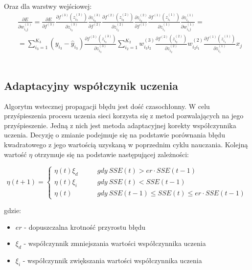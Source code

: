 \documentclass[12pt,twoside]{article}
\begin{document}
Oraz dla warstwy wejściowej:\\
\begin{equation}
\begin{aligned}
&\frac{\partial E}{\partial w_{i_{1}j}^{(1)}} = \frac{\partial E}{\partial f^{(3)}} \frac{\partial f^{(3)}\left( z_{i_{3}}^{(3)} \right)}{\partial z_{i_{3}}^{(3)}} \frac{\partial z_{i_{3}}^{(3)}}{\partial f^{(2)}} \frac{\partial f^{(2)}\left( z_{i_{2}}^{(2)} \right)}{\partial z_{i_{2}}^{(2)}} \frac{\partial z_{i_{2}}^{(2)}}{\partial f^{(1)}}  \frac{\partial f^{(1)}\left( z_{i_{1}}^{(1)} \right)}{\partial z_{i_{1}}^{(1)}} \frac{\partial z_{i_{1}}^{(1)}}{\partial w_{i_{1}j}^{(1)}}  =\\
&= \sum_{i_{3}=1}^{K_3}\left( y_{i_{3}} - \hat{y}_{i_{3}} \right) \frac{\partial f^{(3)}\left( z_{i_{3}}^{(3)} \right)}{\partial z_{i_{3}}^{(3)}} \sum_{i_{2}=1}^{K_2} w_{i_{3}i_{2}}^{(3)} \frac{\partial f^{(2)}\left( z_{i_{2}}^{(2)} \right)}{\partial z_{i_{2}}^{(2)}} w_{i_{2}i_{1}}^{(2)} \frac{\partial f^{(1)}\left( z_{i_{1}}^{(1)} \right)}{\partial z_{i_{1}}^{(1)}} x_j
\end{aligned}
\end{equation}
\\
\subsection{Adaptacyjny współczynik uczenia}

Algorytm wstecznej propagacji błędu jest dość czasochłonny. W celu przyśpieszenia procesu uczenia sieci korzysta się z metod pozwalających na jego przyśpieszenie. Jedną z nich jest metoda adaptacyjnej korekty współczynnika uczenia. Decyzję o zmianie podejmuje się na podstawie porównania błędu kwadratowego z jego wartością uzyskaną w poprzednim cyklu nauczania. Kolejną wartość $\eta$ otrzymuje się na podstawie następującej zależności:

\begin{equation}
\eta (t + 1) =
\left\{\begin{aligned}
\eta (t)  \xi_d  & \qquad gdy\ SSE(t) > er \cdot SSE(t - 1)\\
\eta (t)  \xi_i  & \qquad gdy\ SSE(t) < SSE(t - 1)\\
\eta (t)   & \qquad gdy\ SSE(t - 1) \leq SSE(t) \leq er \cdot SSE(t - 1)
\end{aligned}\right.
\end{equation}

gdzie:
\begin{itemize}
\item $er$ - dopuszczalna krotność przyrostu błędu
\item $\xi_d$ - współczynnik zmniejszania wartości współczynnika uczenia
\item $\xi_i$ - współczynnik zwiększania wartości współczynnika uczenia
\end{itemize}
\clearpage
\end{document}
